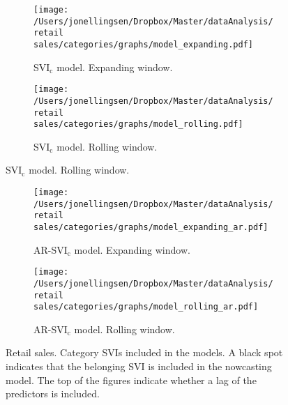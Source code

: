 \begin{figure}[ht]
\centering
    \begin{subfigure}[b]{\textwidth}
\caption{SVI$_{\text{c}}$ model. Expanding window.}
        \texttt{[image: /Users/jonellingsen/Dropbox/Master/dataAnalysis/retail sales/categories/graphs/model\_expanding.pdf]}
    \end{subfigure}
    \begin{subfigure}[b]{\textwidth}
\caption{SVI$_{\text{c}}$ model. Rolling window.}
        \texttt{[image: /Users/jonellingsen/Dropbox/Master/dataAnalysis/retail sales/categories/graphs/model\_rolling.pdf]}
    \end{subfigure}
\end{figure}
\begin{figure}\ContinuedFloat
\begin{subfigure}[b]{\textwidth}
 \caption{AR-SVI$_{\text{c}}$ model. Expanding window.}        
\texttt{[image: /Users/jonellingsen/Dropbox/Master/dataAnalysis/retail sales/categories/graphs/model\_expanding\_ar.pdf]}
    \end{subfigure}
\begin{subfigure}[b]{\textwidth}
\caption{AR-SVI$_{\text{c}}$ model. Rolling window.}        
\texttt{[image: /Users/jonellingsen/Dropbox/Master/dataAnalysis/retail sales/categories/graphs/model\_rolling\_ar.pdf]}
    \end{subfigure}
    \caption{Retail sales. Category SVIs included in the models. A black spot indicates that the belonging SVI is included in the nowcasting model. The top of the figures indicate whether a lag of the predictors is included.}
\label{model_cat_rsales}
\end{figure}

